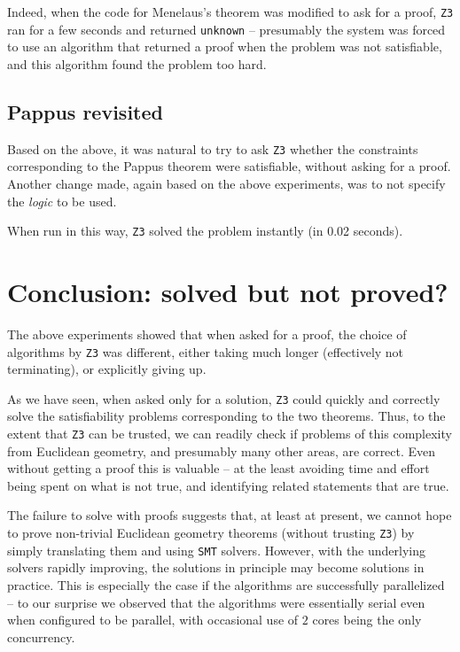 \documentclass{amsart}
\theoremstyle{plain}
\theoremstyle{definition}
\theoremstyle{remark}
\begin{document}
Indeed, when the code for Menelaus's theorem was modified to ask for a
proof, \texttt{Z3} ran for a few seconds and returned \texttt{unknown} --
presumably the system was forced to use an algorithm that returned a
proof when the problem was not satisfiable, and this algorithm found the
problem too hard.

\subsection{Pappus revisited}

Based on the above, it was natural to try to ask \texttt{Z3} whether the
constraints corresponding to the Pappus theorem were satisfiable,
without asking for a proof. Another change made, again based on the
above experiments, was to not specify the \emph{logic} to be used.

When run in this way, \texttt{Z3} solved the problem instantly (in 0.02 seconds).



\section{Conclusion: solved but not proved?}

The above experiments showed that when asked for a proof, the choice of algorithms by \texttt{Z3}
was different, either taking much longer (effectively not terminating),
or explicitly giving up.

As we have seen, when asked only for a solution, \texttt{Z3} could quickly and correctly solve the
satisfiability problems corresponding to the two theorems.
Thus, to the extent that \texttt{Z3} can be trusted, we can readily check if
problems of this complexity from Euclidean geometry, and presumably many
other areas, are correct. Even without getting a proof this is valuable
-- at the least avoiding time and effort being spent on what is not
true, and identifying related statements that are true.

The failure to solve with proofs suggests that, at least at present, we cannot hope to
prove non-trivial Euclidean geometry theorems (without trusting \texttt{Z3}) by simply translating
them and using \texttt{SMT} solvers. However, with the underlying solvers rapidly
improving, the solutions in principle may become solutions in practice.
This is especially the case if the algorithms are successfully
parallelized -- to our surprise we observed that the algorithms were
essentially serial even when configured to be parallel, with occasional
use of \(2\) cores being the only concurrency.
\end{document}
